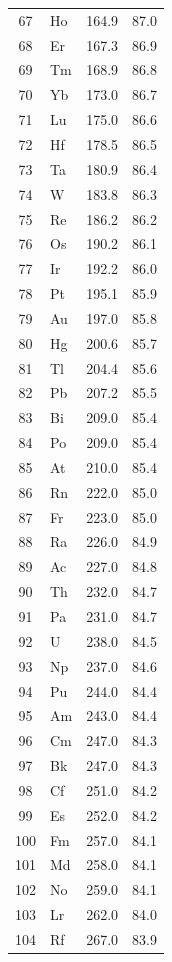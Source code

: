 \documentclass[11pt,a4paper]{article}
\begin{document}
\begin{longtable}{c l c c}
		67 & Ho  & 164.9  & 87.0 \\
		68 & Er  & 167.3  & 86.9 \\
		69 & Tm  & 168.9  & 86.8 \\
		70 & Yb  & 173.0  & 86.7 \\
		71 & Lu  & 175.0  & 86.6 \\
		72 & Hf  & 178.5  & 86.5 \\
		73 & Ta  & 180.9  & 86.4 \\
		74 & W   & 183.8  & 86.3 \\
		75 & Re  & 186.2  & 86.2 \\
		76 & Os  & 190.2  & 86.1 \\
		77 & Ir  & 192.2  & 86.0 \\
		78 & Pt  & 195.1  & 85.9 \\
		79 & Au  & 197.0  & 85.8 \\
		80 & Hg  & 200.6  & 85.7 \\
		81 & Tl  & 204.4  & 85.6 \\
		82 & Pb  & 207.2  & 85.5 \\
		83 & Bi  & 209.0  & 85.4 \\
		84 & Po  & 209.0  & 85.4 \\
		85 & At  & 210.0  & 85.4 \\
		86 & Rn  & 222.0  & 85.0 \\
		87 & Fr  & 223.0  & 85.0 \\
		88 & Ra  & 226.0  & 84.9 \\
		89 & Ac  & 227.0  & 84.8 \\
		90 & Th  & 232.0  & 84.7 \\
		91 & Pa  & 231.0  & 84.7 \\
		92 & U   & 238.0  & 84.5 \\
		93 & Np  & 237.0  & 84.6 \\
		94 & Pu  & 244.0  & 84.4 \\
		95 & Am  & 243.0  & 84.4 \\
		96 & Cm  & 247.0  & 84.3 \\
		97 & Bk  & 247.0  & 84.3 \\
		98 & Cf  & 251.0  & 84.2 \\
		99 & Es  & 252.0  & 84.2 \\
		100& Fm  & 257.0  & 84.1 \\
		101& Md  & 258.0  & 84.1 \\
		102& No  & 259.0  & 84.1 \\
		103& Lr  & 262.0  & 84.0 \\
		104& Rf  & 267.0  & 83.9 \\

\end{longtable}
\end{document}
